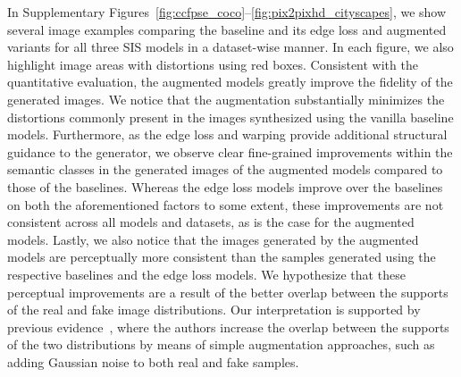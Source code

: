 \documentclass[final]{cvpr}
\newcommand\+{\mkern4mu}
\begin{document}
In Supplementary Figures~\ref{fig:ccfpse_coco}--\ref{fig:pix2pixhd_cityscapes}, we show several image examples comparing the baseline and its edge loss and augmented variants for all three SIS models in a dataset-wise manner. In each figure, we also highlight image areas with distortions using red boxes. Consistent with the quantitative evaluation, the augmented models greatly improve the fidelity of the generated images. We notice that the augmentation substantially minimizes the distortions commonly present in the images synthesized using the vanilla baseline models. Furthermore, as the edge loss and warping provide additional structural guidance to the generator, we observe clear fine-grained improvements within the semantic classes in the generated images of the augmented models compared to those of the baselines. Whereas the edge loss models improve over the baselines on both the aforementioned factors to some extent, these improvements are not consistent across all models and datasets, as is the case for the augmented models. Lastly, we also notice that the images generated by the augmented models are perceptually more consistent than the samples generated using the respective baselines and the edge loss models. We hypothesize that these perceptual improvements are a result of the better overlap between the supports of the real and fake image distributions. Our interpretation is supported by previous evidence~\cite{Sonderby2016AmortisedMI}, where the authors increase the overlap between the supports of the two distributions by means of simple augmentation approaches, such as adding Gaussian noise to both real and fake samples. 

\clearpage
\end{document}
